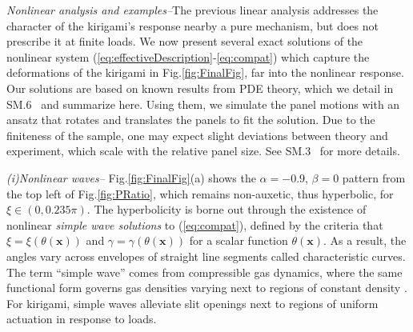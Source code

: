 \documentclass[aps,prl,twocolumn,superscriptaddress]{revtex4-1}
\begin{document}
\textit{Nonlinear analysis and examples\;--}\;The previous linear analysis addresses the character of the kirigami's response nearby a pure mechanism, but does not prescribe it at  finite loads. We now present several exact solutions of the nonlinear system (\ref{eq:effectiveDescription}-\ref{eq:compat}) which capture the deformations of the kirigami in Fig.\;\ref{fig:FinalFig}, far into the nonlinear response. Our solutions are based on known results from PDE theory, which we detail in SM.6~\cite{suppl} and summarize here. %
Using them, we simulate the panel motions with an ansatz that rotates and translates the panels to fit the solution. Due to the finiteness of the sample, one may expect slight deviations between theory and experiment, which scale with the relative panel size. See SM.3~\cite{suppl} for more details.   %


\noindent\textit{(i)\;Nonlinear waves\;--\;}%
 Fig.\;\ref{fig:FinalFig}(a)  shows the $\alpha=-0.9$, $\beta=0$ pattern from the top left of Fig.\;\ref{fig:PRatio}, which remains non-auxetic, thus hyperbolic, for $\xi \in  (0, 0.235 \pi)$.  The hyperbolicity is borne out through the existence of nonlinear \textit{simple wave solutions} to (\ref{eq:compat}),  defined by the criteria that $\xi=\xi(\theta(\mathbf{x}))$ and $\gamma = \gamma(\theta(\mathbf{x}))$ for a scalar function $\theta(\mathbf{x})$. As a result, the angles vary across envelopes of straight line segments called characteristic curves. The term ``simple wave'' comes from compressible gas dynamics, where the same functional form governs gas densities varying next to regions of constant density \cite{courant1999supersonic}. For kirigami, simple waves alleviate slit openings next to regions of uniform actuation in response to loads. 
 
\end{document}
